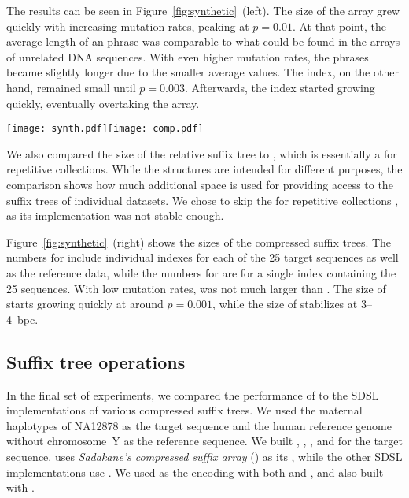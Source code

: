 The results can be seen in Figure~\ref{fig:synthetic}~(left). The size of the \RLCP{}
array grew quickly with increasing mutation rates, peaking at $p = 0.01$.
At that point, the average length of an \RLZ{} phrase was comparable to what
could be found in the \DLCP{} arrays of unrelated DNA sequences. With even
higher mutation rates, the phrases became slightly longer due to the smaller
average \LCP{} values. The \RFM{} index, on the other hand, remained small
until $p = 0.003$. Afterwards, the index started growing quickly, eventually
overtaking the \RLCP{} array.

\begin{figure*}
\begin{center}
\texttt{[image: synth.pdf]}\hspace{-0.6in}\texttt{[image: comp.pdf]}
\end{center}
\caption{Index size in bits per character vs.\ mutation rate for 25
synthetic sequences relative to a 20~MB reference.}\label{fig:synthetic}
\end{figure*}

We also compared the size of the relative suffix tree to \GCT{} \cite{Navarro2015},
which is essentially a \CSTsada{} for repetitive collections.
While the structures are intended for different purposes, the comparison shows how
much additional space is used for providing access to the suffix trees
of individual datasets. We chose to skip the \CSTnpr{} for repetitive collections
\cite{Abeliuk2013}, as its implementation was not stable enough.

Figure~\ref{fig:synthetic}~(right) shows the sizes of the compressed suffix
trees. The numbers for \RCST{} include individual indexes for each of the 25
target sequences as well as the reference data, while the numbers for \GCT{}
are for a single index containing the 25 sequences. With low mutation rates,
\RCST{} was not much larger than \GCT{}. The size of \RCST{} starts growing
quickly at around $p = 0.001$, while the size of \GCT{} stabilizes at
3\nobreakdash--4~bpc.

\subsection{Suffix tree operations}

In the final set of experiments, we compared the performance of \RCST{} to the
SDSL implementations of various compressed suffix trees. We used the maternal
haplotypes of NA12878 as the target sequence and the human reference genome
without chromosome~Y as the reference sequence. We built \RCST, \CSTsada,
\CSTnpr, and \FCST{} for the target sequence. \CSTsada{} uses \emph{Sadakane's
compressed suffix array} (\CSAsada) \cite{Sadakane2003} as its \CSA, while the
other SDSL implementations use \SSA. We used \PLCP{} as the \LCP{} encoding
with both \CSTsada{} and \CSTnpr{}, and also built \CSTnpr{} with \LCPdac.

